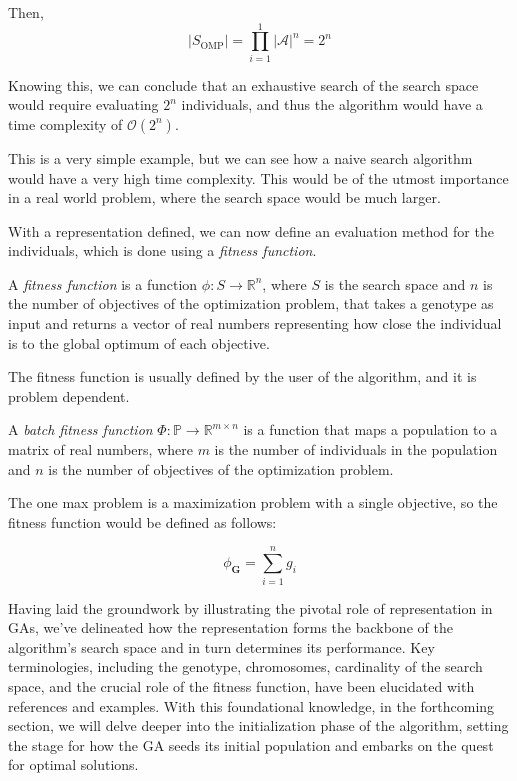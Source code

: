   Then,
  \[
    |S_\mathrm{OMP}| = \prod_{i=1}^1 |\mathcal{A}|^n = 2^n
  \]

  Knowing this, we can conclude that an exhaustive search of the search space 
  would require 
  evaluating \(2^n\) individuals, and thus the algorithm would have a time complexity of 
  \(\mathcal{O}(2^n)\).
  
  This is a very simple example, but we can see how a naive search algorithm would have a very
  high time complexity.
  This would be of the utmost importance in a real world problem, where the search space would be
  much larger.

  With a representation defined, we can now define an evaluation method for the individuals, which
  is done using a \emph{fitness function}.

  \begin{definition}
  \label{def:fitness_function}
    A \emph{fitness function} is a function \(\phi: S \rightarrow \mathbb{R}^n\), where \(S\) is the
    search space and \(n\) is the number of objectives of the optimization problem, that takes a
    genotype as input and returns a vector of real numbers representing how close the individual 
    is to the global optimum of each objective.

    The fitness function is usually defined by the user of the algorithm, and it is problem
    dependent.
  \end{definition}

  \begin{definition}
  \label{def:batch_fitness_function}
    A \emph{batch fitness function} \(\Phi: \mathbb{P} \rightarrow \mathbb{R}^{m \times n}\) is a 
    function that maps a population to a matrix of real numbers, where \(m\) is the number of
    individuals in the population and \(n\) is the number of objectives of the optimization
    problem.
  \end{definition}

  The one max problem is a maximization problem with a single objective, so the
  fitness function would be defined as follows:

  \begin{equation}
    \label{eq:fitness_function:one_max}
    \phi_\mathbf{G} = \sum_{i=1}^n g_i
  \end{equation}

  Having laid the groundwork by illustrating the pivotal role of representation 
  in GAs, we've delineated how the representation forms the backbone of the 
  algorithm's search space and in turn determines its performance.
  Key terminologies, including the genotype, chromosomes, cardinality of the 
  search space, and the crucial role of the fitness function, have been 
  elucidated with references and examples.
  With this foundational knowledge, in the forthcoming section, we will delve 
  deeper into the initialization phase of the algorithm, setting the stage for 
  how the GA seeds its initial population and embarks on the quest for optimal 
  solutions.